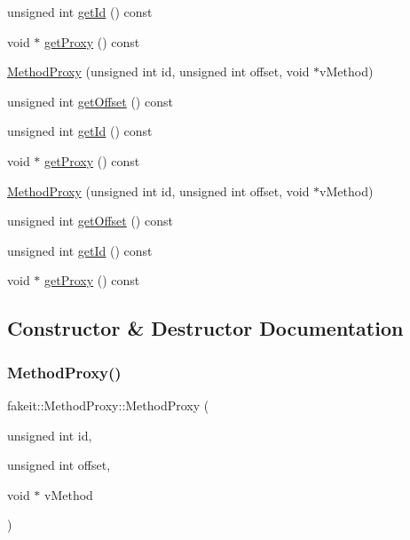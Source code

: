\begin{DoxyCompactItemize}
unsigned int \mbox{\hyperlink{structfakeit_1_1MethodProxy_a00370ab06d9c4f4b9affb9ec3bdd72fe}{get\+Id}} () const
\item 
void $\ast$ \mbox{\hyperlink{structfakeit_1_1MethodProxy_ab27c6485484c610f7a35bb832fc571ea}{get\+Proxy}} () const
\item 
\mbox{\hyperlink{structfakeit_1_1MethodProxy_a425b37c610166fd5368505aa53cc970c}{Method\+Proxy}} (unsigned int id, unsigned int offset, void $\ast$v\+Method)
\item 
unsigned int \mbox{\hyperlink{structfakeit_1_1MethodProxy_abc59fc5a670eda3f83c981cf4ac7bd68}{get\+Offset}} () const
\item 
unsigned int \mbox{\hyperlink{structfakeit_1_1MethodProxy_a00370ab06d9c4f4b9affb9ec3bdd72fe}{get\+Id}} () const
\item 
void $\ast$ \mbox{\hyperlink{structfakeit_1_1MethodProxy_ab27c6485484c610f7a35bb832fc571ea}{get\+Proxy}} () const
\item 
\mbox{\hyperlink{structfakeit_1_1MethodProxy_a425b37c610166fd5368505aa53cc970c}{Method\+Proxy}} (unsigned int id, unsigned int offset, void $\ast$v\+Method)
\item 
unsigned int \mbox{\hyperlink{structfakeit_1_1MethodProxy_abc59fc5a670eda3f83c981cf4ac7bd68}{get\+Offset}} () const
\item 
unsigned int \mbox{\hyperlink{structfakeit_1_1MethodProxy_a00370ab06d9c4f4b9affb9ec3bdd72fe}{get\+Id}} () const
\item 
void $\ast$ \mbox{\hyperlink{structfakeit_1_1MethodProxy_ab27c6485484c610f7a35bb832fc571ea}{get\+Proxy}} () const
\end{DoxyCompactItemize}


\subsection{Constructor \& Destructor Documentation}
\mbox{\label{structfakeit_1_1MethodProxy_a425b37c610166fd5368505aa53cc970c}} 
\subsubsection{\texorpdfstring{MethodProxy()}{MethodProxy()}\hspace{0.1cm}{\footnotesize\ttfamily [1/9]}}
{\footnotesize\ttfamily fakeit\+::\+Method\+Proxy\+::\+Method\+Proxy (\begin{DoxyParamCaption}\item[{unsigned int}]{id,  }\item[{unsigned int}]{offset,  }\item[{void $\ast$}]{v\+Method }\end{DoxyParamCaption})\hspace{0.3cm}{\ttfamily [inline]}}

